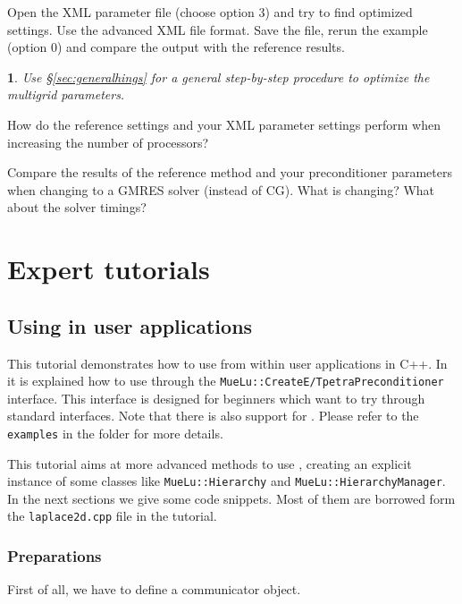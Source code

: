 \documentclass[10pt,fleqn]{book}
\newtheorem*{mycomment}{\ding{42}}
\providecommand\printCppListing[1]{

}
\begin{document}
\begin{exercise}
Open the XML parameter file (choose option 3) and try to find optimized settings. Use the advanced XML file format. Save the file, rerun the example (option 0) and compare the output with the reference results.
\end{exercise}

\begin{mycomment}
Use \S\ref{sec:generalhings} for a general step-by-step procedure to optimize the multigrid parameters.
\end{mycomment}

\begin{exercise}
How do the reference settings and your XML parameter settings perform when increasing the number of processors?
\end{exercise}

\begin{exercise}
Compare the results of the reference method and your preconditioner parameters when changing to a GMRES solver (instead of CG). What is changing? What about the solver timings?
\end{exercise}


\part{Expert tutorials}

\chapter{Using \muelu in user applications}

This tutorial demonstrates how to use \muelu from within user applications in C++. In \cite[Section 2.6]{Mue} it is explained how to use \muelu through the \texttt{MueLu::CreateE/TpetraPreconditioner} interface. This interface is designed for beginners which want to try \muelu through standard \trilinos interfaces. Note that there is also support for \stratimikos. Please refer to the \texttt{examples} in the \muelu folder for more details.

This tutorial aims at more advanced methods to use \muelu, creating an explicit instance of some \muelu classes like \texttt{MueLu::Hierarchy} and \texttt{MueLu::HierarchyManager}. In the next sections we give some code snippets. Most of them are borrowed form the \texttt{laplace2d.cpp} file in the tutorial.

\section{Preparations}
First of all, we have to define a communicator object.
\printCppListing{laplace2d.cpp_2.fragment}
\end{document}
